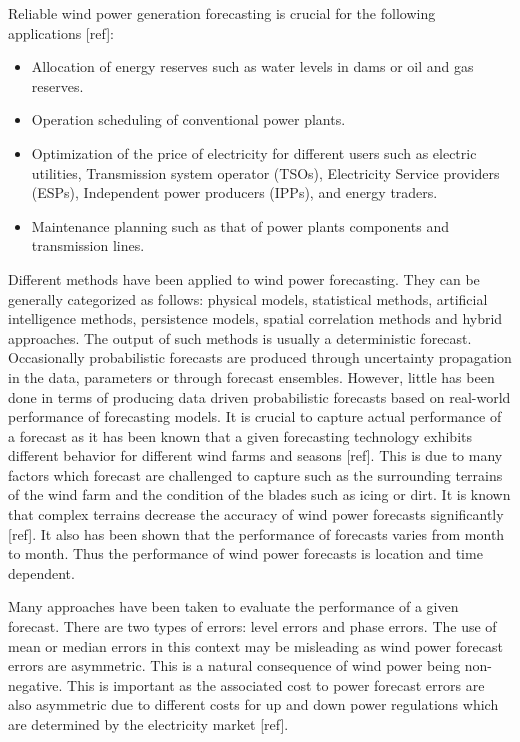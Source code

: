 \documentclass[10pt,twocolumn,letterpaper]{article}
\begin{document}
Reliable wind power generation forecasting is crucial for the following applications [ref]:
\begin{itemize}
\item Allocation of energy reserves such as water levels in dams or oil and gas reserves.
\item Operation scheduling of conventional power plants.
\item Optimization of the price of electricity for different users such as electric utilities, Transmission system operator (TSOs), Electricity Service providers (ESPs), Independent power producers (IPPs), and energy traders.
\item Maintenance planning such as that of power plants components and transmission lines.

\end{itemize}

Different methods have been applied to wind power forecasting. They can be generally categorized as follows: physical models, statistical methods, artificial intelligence methods, persistence models, spatial correlation methods and hybrid approaches. The output of such methods is usually a deterministic forecast. Occasionally probabilistic forecasts are produced through uncertainty propagation in the data, parameters or through forecast ensembles. However, little has been done in terms of producing data driven probabilistic forecasts based on real-world performance of forecasting models. It is crucial to capture actual performance of a forecast as it has been known that a given forecasting technology exhibits different behavior for different wind farms and seasons [ref]. This is due to many factors which forecast are challenged to capture such as the surrounding terrains of the wind farm and the condition of the blades such as icing or dirt. It is known that complex terrains decrease the accuracy of wind power forecasts significantly [ref]. It also has been shown that the performance of forecasts varies from month to month. Thus the performance of wind power forecasts is location and time dependent.

Many approaches have been taken to evaluate the performance of a given forecast. There are two types of errors: level errors and phase errors. The use of mean or median errors in this context may be misleading as wind power forecast errors are asymmetric. This is a natural consequence of wind power being non-negative. This is important as the associated cost to power forecast errors are also asymmetric due to different costs for up and down  power regulations which are determined by the electricity market [ref].
\end{document}
